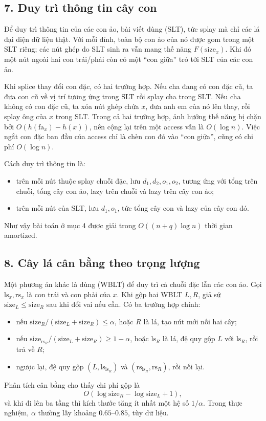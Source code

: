 \documentclass[11pt]{article}
\begin{document}
\subsection*{7. Duy trì thông tin cây con}

Để duy trì thông tin của các con ảo, bài viết dùng
 (SLT), tức splay mà chỉ các lá đại diện dữ liệu thật.
Với mỗi đỉnh, toàn bộ con ảo của nó được gom trong một SLT riêng; các nút ghép
do SLT sinh ra vẫn mang thế năng \(F(\mathrm{size}_x)\). Khi đó một nút ngoài
hai con trái/phải còn có một ``con giữa'' trỏ tới SLT của các con ảo.

Khi \(\mathrm{splice}\) thay đổi con đặc, có hai trường hợp. Nếu cha đang có
con đặc cũ, ta đưa con cũ về vị trí tương ứng trong SLT rồi splay cha trong
SLT. Nếu cha không có con đặc cũ, ta xóa nút ghép chứa \(x\), đưa anh em của
nó lên thay, rồi splay ông của \(x\) trong SLT. Trong cả hai trường hợp, ảnh
hưởng thế năng bị chặn bởi \(O(h(\mathrm{fa}_x)-h(x))\), nên cộng lại trên một
access vẫn là \(O(\log n)\). Việc ngắt con đặc ban đầu của access chỉ là chèn
con đó vào ``con giữa'', cũng có chi phí \(O(\log n)\).

Cách duy trì thông tin là:
\begin{itemize}
  \item trên mỗi nút thuộc splay chuỗi đặc, lưu \(d_1,d_2,o_1,o_2\), tương ứng
  với tổng trên chuỗi, tổng cây con ảo, lazy trên chuỗi và lazy trên cây con ảo;
  \item trên mỗi nút của SLT, lưu \(d_1,o_1\), tức tổng cây con và lazy của
  cây con đó.
\end{itemize}
Như vậy bài toán ở mục 4 được giải trong \(O((n+q)\log n)\) thời gian
amortized.

\subsection*{8. Cây lá cân bằng theo trọng lượng}

Một phương án khác là dùng
 (WBLT) để duy trì cả chuỗi đặc lẫn các con
ảo. Gọi \(\mathrm{ls}_x,\mathrm{rs}_x\) là con trái và con phải của \(x\). Khi
gộp hai WBLT \(L,R\), giả sử \(\mathrm{size}_L\le\mathrm{size}_R\) sau khi đổi
vai nếu cần. Có ba trường hợp chính:
\begin{itemize}
  \item nếu \(\mathrm{size}_R/(\mathrm{size}_L+\mathrm{size}_R)\le\alpha\), hoặc
  \(R\) là lá, tạo nút mới nối hai cây;
  \item nếu \(\mathrm{size}_{\mathrm{rs}_R}/(\mathrm{size}_L+\mathrm{size}_R)
  \ge 1-\alpha\), hoặc \(\mathrm{ls}_R\) là lá, đệ quy gộp \(L\) với
  \(\mathrm{ls}_R\), rồi trả về \(R\);
  \item ngược lại, đệ quy gộp \((L,\mathrm{ls}_{\mathrm{ls}_R})\) và
  \((\mathrm{rs}_{\mathrm{ls}_R},\mathrm{rs}_R)\), rồi nối lại.
\end{itemize}
Phân tích cân bằng cho thấy chi phí gộp là
\[
  O(\log \mathrm{size}_R-\log \mathrm{size}_L+1),
\]
và khi đi lên ba tầng thì kích thước tăng ít nhất một hệ số \(1/\alpha\). Trong
thực nghiệm, \(\alpha\) thường lấy khoảng \(0.65\)--\(0.85\), tùy dữ liệu.
\end{document}
